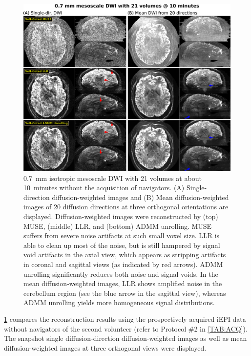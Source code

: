 \documentclass[AMA,STIX2COL,Linenumberson]{MRM}
\begin{document}
\begin{figure}
    \centering
    \includegraphics[width=\textwidth]{./figures/fig6.png}
    \caption{0.7~mm isotropic mesoscale DWI with 21 volumes at about 10~minutes
        without the acquisition of navigators.
        (A) Single-direction diffusion-weighted images and
        (B) Mean diffusion-weighted images of 20 diffusion directions
        at three orthogonal orientations are displayed.
        Diffusion-weighted images were reconstructed by
        (top) MUSE, (middle) LLR, and (bottom) ADMM unrolling.
        MUSE suffers from severe noise artifacts at such small voxel size.
        LLR is able to clean up most of the noise,
        but is still hampered by signal void artifacts in the axial view,
        which appears as stripping artifacts in coronal and sagittal views
        (as indicated by red arrows).
        ADMM unrolling significantly reduces both noise and signal voids.
        In the mean diffusion-weighted images, LLR shows amplified noise
        in the cerebellum region (see the blue arrow in the sagittal view),
        whereas ADMM unrolling yields more homogeneous signal distributions.}
    \label{FIG:MOTION_PROS}
\end{figure}

\cref{FIG:MOTION_PROS} compares the reconstruction results
using the prospectively acquired iEPI data without navigators
of the second volunteer
(refer to Protocol \#2 in \cref{TAB:ACQ}).
The snapshot single diffusion-direction diffusion-weighted images
as well as mean diffusion-weighted images
at three orthogonal views were displayed.
\end{document}
